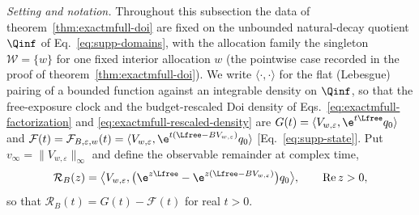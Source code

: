 \emph{Setting and notation.}
Throughout this subsection the data of theorem~\ref{thm:exactmfull-doi} are
fixed on the unbounded natural-decay quotient \(\Qinf\) of
Eq.~\eqref{eq:supp-domains}, with the allocation family the singleton
\(\mathcal W=\{w\}\) for one fixed interior allocation \(w\) (the pointwise
case recorded in the proof of theorem~\ref{thm:exactmfull-doi}).  We write
\(\langle\cdot,\cdot\rangle\) for the flat (Lebesgue) pairing of a bounded
function against an integrable density on \(\Qinf\), so that the
free-exposure clock and the budget-rescaled Doi density of
Eqs.~\eqref{eq:exactmfull-factorization} and
\eqref{eq:exactmfull-rescaled-density} are
\(G(t)=\langle V_{w,\varepsilon},\e^{t\Lfree}q_0\rangle\) and
\(\mathcal F(t)=\mathcal F_{B,\varepsilon,w}(t)
=\langle V_{w,\varepsilon},\e^{t(\Lfree-BV_{w,\varepsilon})}q_0\rangle\)
[Eq.~\eqref{eq:supp-state}].  Put
\(v_\infty=\|V_{w,\varepsilon}\|_\infty\) and define the observable
remainder at complex time,
\begin{equation}
 \mathcal R_B(z)
 =\bigl\langle V_{w,\varepsilon},
 \bigl(\e^{z\Lfree}-\e^{z(\Lfree-BV_{w,\varepsilon})}\bigr)q_0
 \bigr\rangle,
 \qquad \operatorname{Re}z>0,
 \label{eq:exactmfull-b0-remainder}
\end{equation}
so that \(\mathcal R_B(t)=G(t)-\mathcal F(t)\) for real \(t>0\).

